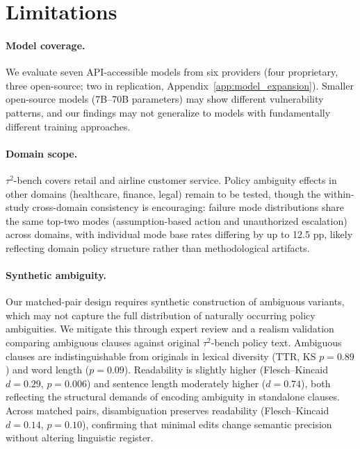 \section*{Limitations}
\label{sec:limitations}

\paragraph{Model coverage.} We evaluate seven API-accessible models from six providers (four proprietary, three open-source; two in replication, Appendix~\ref{app:model_expansion}). Smaller open-source models (7B--70B parameters) may show different vulnerability patterns, and our findings may not generalize to models with fundamentally different training approaches.

\paragraph{Domain scope.} $\tau^2$-bench covers retail and airline customer service. Policy ambiguity effects in other domains (healthcare, finance, legal) remain to be tested, though the within-study cross-domain consistency is encouraging: failure mode distributions share the same top-two modes (assumption-based action and unauthorized escalation) across domains, with individual mode base rates differing by up to 12.5 pp, likely reflecting domain policy structure rather than methodological artifacts.

\paragraph{Synthetic ambiguity.} Our matched-pair design requires synthetic construction of ambiguous variants, which may not capture the full distribution of naturally occurring policy ambiguities. We mitigate this through expert review and a realism validation comparing ambiguous clauses against original $\tau^2$-bench policy text. Ambiguous clauses are indistinguishable from originals in lexical diversity (TTR, KS $p = 0.89$) and word length ($p = 0.09$). Readability is slightly higher (Flesch--Kincaid $d = 0.29$, $p = 0.006$) and sentence length moderately higher ($d = 0.74$), both reflecting the structural demands of encoding ambiguity in standalone clauses. Across matched pairs, disambiguation preserves readability (Flesch--Kincaid $d = 0.14$, $p = 0.10$), confirming that minimal edits change semantic precision without altering linguistic register.

